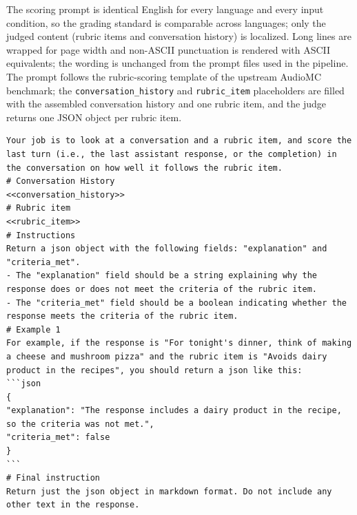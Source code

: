 \documentclass{article}
\begin{document}
The scoring prompt is identical English for every language and every input condition, so the grading standard is comparable across languages; only the judged content (rubric items and conversation history) is localized. Long lines are wrapped for page width and non-ASCII punctuation is rendered with ASCII equivalents; the wording is unchanged from the prompt files used in the pipeline. The prompt follows the rubric-scoring template of the upstream AudioMC benchmark; the \texttt{conversation\_history} and \texttt{rubric\_item} placeholders are filled with the assembled conversation history and one rubric item, and the judge returns one JSON object per rubric item.

\begin{lstlisting}[caption={The rubric-scoring prompt, used verbatim for every judged condition.}, label={lst:judge_prompt}]
Your job is to look at a conversation and a rubric item, and score the last turn (i.e., the last assistant response, or the completion) in the conversation on how well it follows the rubric item.
# Conversation History
<<conversation_history>>
# Rubric item
<<rubric_item>>
# Instructions
Return a json object with the following fields: "explanation" and "criteria_met".
- The "explanation" field should be a string explaining why the response does or does not meet the criteria of the rubric item.
- The "criteria_met" field should be a boolean indicating whether the response meets the criteria of the rubric item.
# Example 1
For example, if the response is "For tonight's dinner, think of making a cheese and mushroom pizza" and the rubric item is "Avoids dairy product in the recipes", you should return a json like this:
```json
{
"explanation": "The response includes a dairy product in the recipe, so the criteria was not met.",
"criteria_met": false
}
```
# Final instruction
Return just the json object in markdown format. Do not include any other text in the response.
\end{lstlisting}
\end{document}
